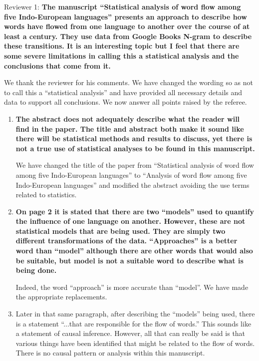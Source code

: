 \documentclass{article}
\begin{document}
	
Reviewer 1: \textbf{The manuscript “Statistical analysis of word flow among five
Indo-European languages” presents an approach to describe how words have flowed
from one language to another over the course of at least a century. They use
data from Google Books N-gram to describe these transitions. It is an
interesting topic but I feel that there are some severe limitations in calling
this a statistical analysis and the conclusions that come from it.}

We thank the reviewer for his comments. We have changed the wording so as not to call this 
a ``statistical analysis'' and have provided all necessary details and data to support all
conclusions. We now answer all points raised by the referee. 

\begin{enumerate}

\item %
\textbf{The abstract does not adequately describe what the reader
will find in the paper. The title and abstract both make it sound like there
will be statistical methods and results to discuss, yet there is not a true use
of statistical analyses to be found in this manuscript.}

We have changed the title of the paper from 
``Statistical analysis of word flow among five Indo-European languages'' to 
``Analysis of word flow among five Indo-European languages'' and modified the abstract avoiding
the use terms related to statistics.
\item \textbf{On page 2 it is stated that there are two ``models'' used to quantify
the influence of one language on another. However, these are not
statistical models that are being used. They are simply two different
transformations of the data. “Approaches” is a better word than
``model'' although there are other words that would also be suitable,
but model is not a suitable word to describe what is being done.}

Indeed, the word ``approach'' is more accurate than ``model''. We have made 
the appropriate replacements. 
\item Later in that same paragraph, after describing the “models” being
used, there is a statement ``...that are responsible for the flow of
words.'' This sounds like a statement of causal inference. However, all
that can really be said is that various things have been identified
that might be related to the flow of words. There is no causal pattern
or analysis within this manuscript.


\end{enumerate}
\end{document}

